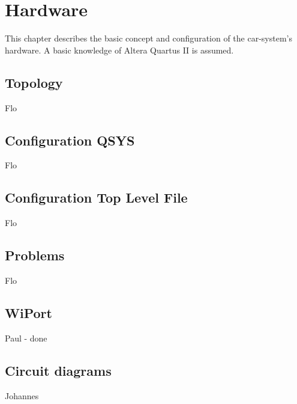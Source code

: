 \chapter{Hardware}
This chapter describes the basic concept and configuration of the car-system's hardware. A basic knowledge of Altera Quartus II is assumed.
\section{Topology}
Flo

\section{Configuration QSYS}
Flo

\section{Configuration Top Level File}
Flo

\section{Problems}
Flo

\section{WiPort}
Paul - done

\section{Circuit diagrams}
Johannes
